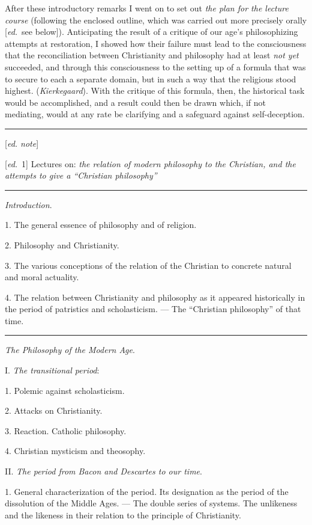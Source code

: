 \documentclass[12pt,a4paper,openany]{book}
\newcommand{\kpage}[1]{\marginnote{\footnotesize\textit{[#1]}}}
\newcommand{\ed}[1]{{\small[\textit{ed.}\ #1]}}
\newcommand{\ednote}[1]{{\small[\textit{ed. note}]}}
\newcommand{\sepline}{\par\begin{center}\rule{2cm}{0.4pt}\end{center}\par}
\begin{document}
After these introductory remarks I went on to set out
\emph{the plan for the lecture course} (following the enclosed outline, which was carried out
more precisely orally \ed{see below}). Anticipating the result of a
critique of our age's philosophizing attempts at restoration, I showed
how their failure must lead to the consciousness that the reconciliation
between Christianity and philosophy had at least \emph{not
yet} succeeded, and through this consciousness to the setting up of
a formula that was to secure to each a separate domain, but in such a way
that the religious stood highest. (\emph{Kierkegaard}). With the critique of this
formula, then, the historical task would be accomplished, and a result
could then be drawn which, if not mediating, would at any rate be clarifying
and a safeguard against self-deception.

\sepline

\ednote{}

\ed{1} Lectures on: \emph{the relation of modern philosophy to the Christian, and the attempts
to give a ``Christian philosophy''}

\sepline

\kpage{74}\emph{Introduction}.

1. The general essence of philosophy and of religion.

2. Philosophy and Christianity.

3. The various conceptions of the relation of the Christian to
concrete natural and moral actuality.

4. The relation between Christianity and philosophy as it appeared historically
in the period of patristics and scholasticism. ---
The ``Christian philosophy'' of that time.

\sepline

\emph{The Philosophy of the Modern Age}.

I. \emph{The transitional period}:

1. Polemic against scholasticism.

2. Attacks on Christianity.

3. Reaction. Catholic philosophy.

4. Christian mysticism and theosophy.

II. \emph{The period from Bacon and Descartes to our time}.

1. General characterization of the period. Its designation
as the period of the dissolution of the Middle Ages. --- The double
series of systems. The unlikeness and the likeness in their relation
to the principle of Christianity.
\end{document}
